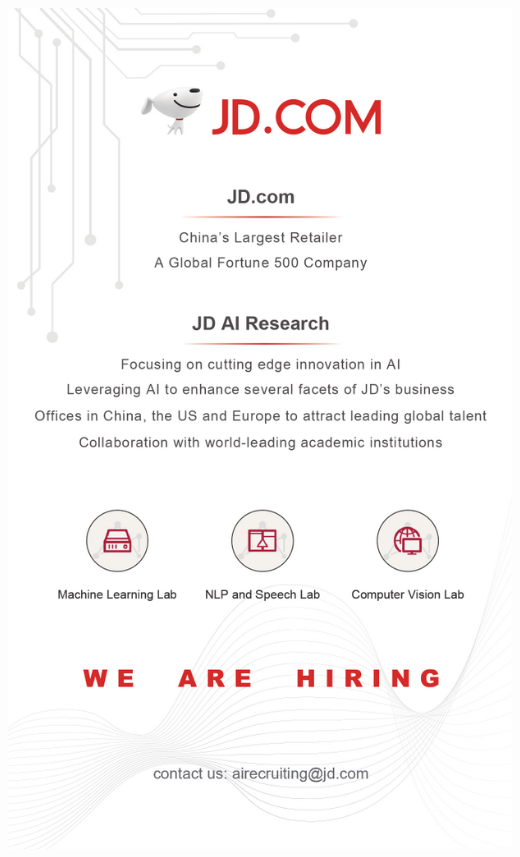 \thispagestyle{empty}
\begin{center}
  \vfill
  \includegraphics[width=\textwidth]{content/ads/full/JD.pdf}
  \vfill
\end{center}
\clearpage

